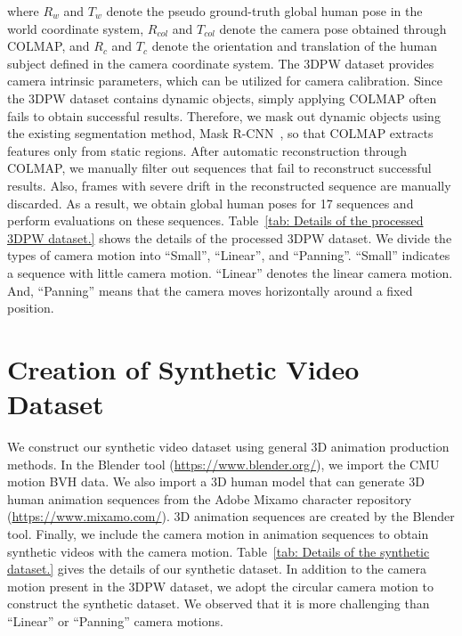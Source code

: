 \documentclass[10pt,twocolumn,letterpaper]{article}
\begin{document}
where $R_{w}$ and $T_{w}$ denote the pseudo ground-truth global human pose in the world coordinate system, $R_{col}$ and $T_{col}$ denote the camera pose obtained through COLMAP, and $R_{c}$ and $T_{c}$ denote the orientation and translation of the human subject defined in the camera coordinate system. The 3DPW dataset provides camera intrinsic parameters, which can be utilized for camera calibration. Since the 3DPW dataset contains dynamic objects, simply applying COLMAP often fails to obtain successful results. Therefore, we mask out dynamic objects using the existing segmentation method, Mask R-CNN~\cite{he2017mask}, so that COLMAP extracts features only from static regions. After automatic reconstruction through COLMAP, we manually filter out sequences that fail to reconstruct successful results. Also, frames with severe drift in the reconstructed sequence are manually discarded. As a result, we obtain global human poses for 17 sequences and perform evaluations on these sequences. Table~\ref{tab: Details of the processed 3DPW dataset.} shows the details of the processed 3DPW dataset. We divide the types of camera motion into ``Small'', ``Linear'', and ``Panning''. ``Small'' indicates a sequence with little camera motion. ``Linear'' denotes the linear camera motion. And, ``Panning'' means that the camera moves horizontally around a fixed position.



\section{Creation of Synthetic Video Dataset}
\label{sec:creation_of_synthetic_video_dataset}

We construct our synthetic video dataset using general 3D animation production methods. In the Blender tool (\url{https://www.blender.org/}), we import the CMU motion BVH data. We also import a 3D human model that can generate 3D human animation sequences from the Adobe Mixamo character repository (\url{https://www.mixamo.com/}). 3D animation sequences are created by the Blender tool. Finally, we include the camera motion in animation sequences to obtain synthetic videos with the camera motion. Table~\ref{tab: Details of the synthetic dataset.} gives the details of our synthetic dataset. In addition to the camera motion present in the 3DPW dataset, we adopt the circular camera motion to construct the synthetic dataset. We observed that it is more challenging than ``Linear'' or ``Panning'' camera motions.
\end{document}
